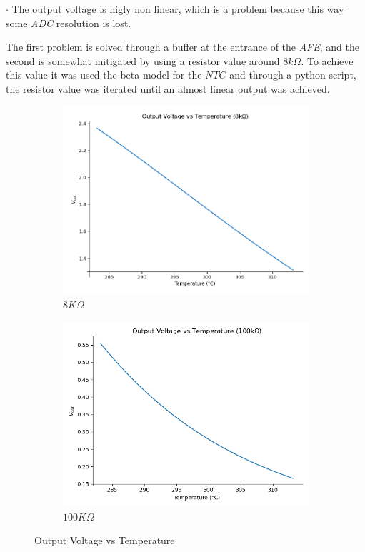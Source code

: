 \documentclass[12pt]{article}
\begin{document}
    $\cdot$ The output voltage is higly non linear, which is a problem because this way some \textit{ADC} resolution is lost.

    The first problem is solved through a buffer at the entrance of the \textit{AFE}, 
    and the second is somewhat mitigated by using a resistor value around $8k \Omega$.
    To achieve this value it was used the beta model for the $NTC$ and through a python script,
    the resistor value was iterated until an almost linear output was achieved. 
    
    \newpage
    
    \begin{figure}[h]
        \centering
        \begin{subfigure}{0.45\textwidth}
            \centering
            \includegraphics[width=\textwidth]{images/VoutPorTemp.png}
            \caption{ $8K\Omega$ }
        \end{subfigure}\hfill
        \begin{subfigure}{0.45\textwidth}
            \centering
            \includegraphics[width=\textwidth]{images/VoutPorTemp100k.png}
            \caption{$100K\Omega$}
        \end{subfigure}
        \caption{Output Voltage vs Temperature}
    \end{figure}
\end{document}
